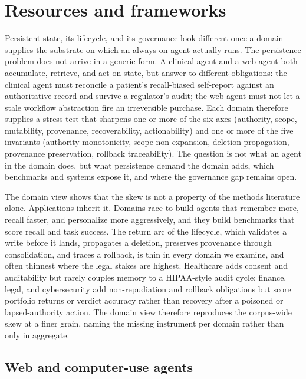 \section{Resources and frameworks}\label{sec:resources}


Persistent state, its lifecycle, and its governance look different once a domain supplies the substrate on which an always-on agent actually runs. The persistence problem does not arrive in a generic form. A clinical agent and a web agent both accumulate, retrieve, and act on state, but answer to different obligations: the clinical agent must reconcile a patient's recall-biased self-report against an authoritative record and survive a regulator's audit; the web agent must not let a stale workflow abstraction fire an irreversible purchase. Each domain therefore supplies a stress test that sharpens one or more of the six axes (authority, scope, mutability, provenance, recoverability, actionability) and one or more of the five invariants (authority monotonicity, scope non-expansion, deletion propagation, provenance preservation, rollback traceability). The question is not what an agent in the domain does, but what persistence demand the domain adds, which benchmarks and systems expose it, and where the governance gap remains open.

The domain view shows that the skew is not a property of the methods literature alone. Applications inherit it. Domains race to build agents that remember more, recall faster, and personalize more aggressively, and they build benchmarks that score recall and task success. The return arc of the lifecycle, which validates a write before it lands, propagates a deletion, preserves provenance through consolidation, and traces a rollback, is thin in every domain we examine, and often thinnest where the legal stakes are highest. Healthcare adds consent and auditability but rarely couples memory to a HIPAA-style audit cycle; finance, legal, and cybersecurity add non-repudiation and rollback obligations but score portfolio returns or verdict accuracy rather than recovery after a poisoned or lapsed-authority action. The domain view therefore reproduces the corpus-wide skew at a finer grain, naming the missing instrument per domain rather than only in aggregate.

\subsection{Web and computer-use agents}

